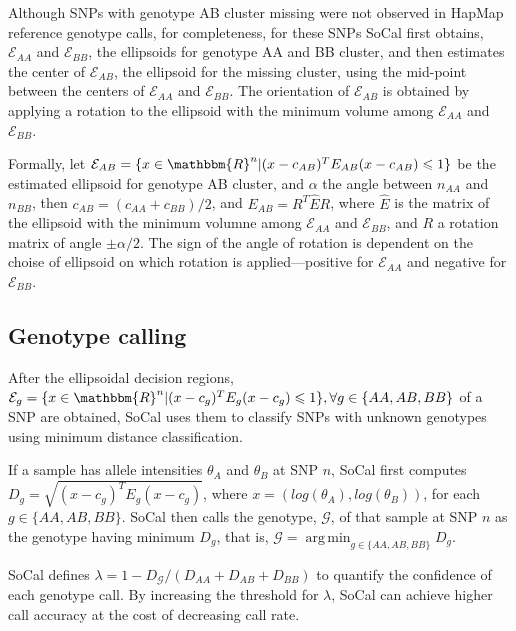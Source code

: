 \documentclass{scrartcl}
\begin{document}
Although SNPs with genotype AB cluster missing were not observed in HapMap
reference genotype calls, for completeness, for these SNPs SoCal first
obtains, $\mathcal{E}_{AA}$ and $\mathcal{E}_{BB}$,
the ellipsoids for genotype AA and BB cluster, and then estimates the
center of $\mathcal{E}_{AB}$, the ellipsoid for the missing cluster, using
the mid-point between the centers of $\mathcal{E}_{AA}$ and $\mathcal{E}_{BB}$.
The orientation of $\mathcal{E}_{AB}$ is obtained by applying a rotation
to the ellipsoid with the minimum volume among $\mathcal{E}_{AA}$ and
$\mathcal{E}_{BB}$.

\par
Formally, let $\mathcal{E}_{AB}=
\{x \in \mathbbm{R}^{n}|(x-c_{AB})^TE_{AB}(x-c_{AB}) \leqslant 1\}$ be the
estimated ellipsoid for genotype AB cluster, and $\alpha$ the angle between
$n_{AA}$ and $n_{BB}$, then
$c_{AB}=(c_{AA}+c_{BB})/2$, and
$E_{AB}=R^{T}\hat{E}R$, where $\hat{E}$ is the matrix of the ellipsoid
with the minimum volumne among $\mathcal{E}_{AA}$ and $\mathcal{E}_{BB}$, and
$R$ a rotation matrix of angle $\pm\alpha/2$.
The sign of the angle of rotation is dependent on the choise of ellipsoid on
which rotation is applied---positive for $\mathcal{E}_{AA}$ and negative
for $\mathcal{E}_{BB}$.

\subsection{Genotype calling}

\par
After the ellipsoidal decision regions,
$\mathcal{E}_{g}=
\{x \in \mathbbm{R}^{n} | (x-c_g)^TE_g(x-c_g) \leqslant 1\},
\forall g\in\{AA,AB,BB\}$ of a SNP are obtained, SoCal uses them to classify
SNPs with unknown genotypes using minimum distance classification.

\par
If a sample has allele intensities $\theta_A$ and $\theta_B$ at SNP $n$,
SoCal first computes
$D_g=\sqrt{(x-c_g)^TE_g(x-c_g)}$,
where $x=(log(\theta_A), log(\theta_B))$, for each $g\in\{AA,AB,BB\}$.
SoCal then calls the genotype, $\mathcal{G}$, of that sample at SNP $n$
as the genotype having minimum $D_g$, that is,
$\mathcal{G}=\operatorname*{arg\,min}_{g\in \{AA,AB,BB\}}D_g$.

\par
SoCal defines $\lambda=1-D_{\mathcal{G}}/(D_{AA}+D_{AB}+D_{BB})$ to quantify
the confidence of each genotype call.
By increasing the threshold for $\lambda$, SoCal can achieve higher call
accuracy at the cost of decreasing call rate.
\end{document}
